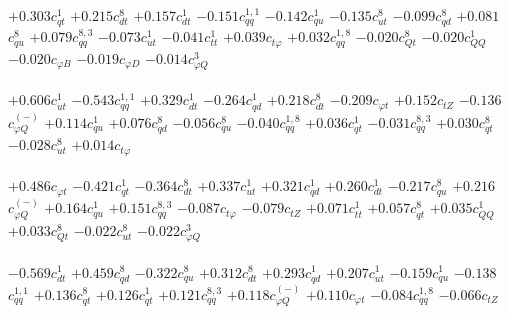 \documentclass{article}
\begin{document}
{$+0.303$}{\rm $c_{qt}^{1}$} 
{$+0.215$}{\rm $c_{dt}^{8}$} 
{$+0.157$}{\rm $c_{dt}^{1}$} 
{$-0.151$}{\rm $c_{qq}^{1,1}$} 
{$-0.142$}{\rm $c_{qu}^{1}$} 
{$-0.135$}{\rm $c_{ut}^{8}$} 
{$-0.099$}{\rm $c_{qd}^{8}$} 
{$+0.081$}{\rm $c_{qu}^{8}$} 
{$+0.079$}{\rm $c_{qq}^{8,3}$} 
{$-0.073$}{\rm $c_{ut}^{1}$} 
{$-0.041$}{\rm $c_{tt}^{1}$} 
{$+0.039$}{\rm $c_{t \varphi}$} 
{$+0.032$}{\rm $c_{qq}^{1,8}$} 
{$-0.020$}{\rm $c_{Qt}^{8}$} 
{$-0.020$}{\rm $c_{QQ}^{1}$} 
{$-0.020$}{\rm $c_{\varphi B}$} 
{$-0.019$}{\rm $c_{\varphi D}$} 
{$-0.014$}{\rm $c_{\varphi Q}^{3}$} 
 \nonumber \\ \nonumber \\ 
{$+0.606$}{\rm $c_{ut}^{1}$} 
{$-0.543$}{\rm $c_{qq}^{1,1}$} 
{$+0.329$}{\rm $c_{dt}^{1}$} 
{$-0.264$}{\rm $c_{qd}^{1}$} 
{$+0.218$}{\rm $c_{dt}^{8}$} 
{$-0.209$}{\rm $c_{\varphi t}$} 
{$+0.152$}{\rm $c_{tZ}$} 
{$-0.136$}{\rm $c_{\varphi Q}^{(-)}$} 
{$+0.114$}{\rm $c_{qu}^{1}$} 
{$+0.076$}{\rm $c_{qd}^{8}$} 
{$-0.056$}{\rm $c_{qu}^{8}$} 
{$-0.040$}{\rm $c_{qq}^{1,8}$} 
{$+0.036$}{\rm $c_{qt}^{1}$} 
{$-0.031$}{\rm $c_{qq}^{8,3}$} 
{$+0.030$}{\rm $c_{qt}^{8}$} 
{$-0.028$}{\rm $c_{ut}^{8}$} 
{$+0.014$}{\rm $c_{t \varphi}$} 
 \nonumber \\ \nonumber \\ 
{$+0.486$}{\rm $c_{\varphi t}$} 
{$-0.421$}{\rm $c_{qt}^{1}$} 
{$-0.364$}{\rm $c_{dt}^{8}$} 
{$+0.337$}{\rm $c_{ut}^{1}$} 
{$+0.321$}{\rm $c_{qd}^{1}$} 
{$+0.260$}{\rm $c_{dt}^{1}$} 
{$-0.217$}{\rm $c_{qu}^{8}$} 
{$+0.216$}{\rm $c_{\varphi Q}^{(-)}$} 
{$+0.164$}{\rm $c_{qu}^{1}$} 
{$+0.151$}{\rm $c_{qq}^{8,3}$} 
{$-0.087$}{\rm $c_{t \varphi}$} 
{$-0.079$}{\rm $c_{tZ}$} 
{$+0.071$}{\rm $c_{tt}^{1}$} 
{$+0.057$}{\rm $c_{qt}^{8}$} 
{$+0.035$}{\rm $c_{QQ}^{1}$} 
{$+0.033$}{\rm $c_{Qt}^{8}$} 
{$-0.022$}{\rm $c_{ut}^{8}$} 
{$-0.022$}{\rm $c_{\varphi Q}^{3}$} 
 \nonumber \\ \nonumber \\ 
{$-0.569$}{\rm $c_{dt}^{1}$} 
{$+0.459$}{\rm $c_{qd}^{8}$} 
{$-0.322$}{\rm $c_{qu}^{8}$} 
{$+0.312$}{\rm $c_{dt}^{8}$} 
{$+0.293$}{\rm $c_{qd}^{1}$} 
{$+0.207$}{\rm $c_{ut}^{1}$} 
{$-0.159$}{\rm $c_{qu}^{1}$} 
{$-0.138$}{\rm $c_{qq}^{1,1}$} 
{$+0.136$}{\rm $c_{qt}^{8}$} 
{$+0.126$}{\rm $c_{qt}^{1}$} 
{$+0.121$}{\rm $c_{qq}^{8,3}$} 
{$+0.118$}{\rm $c_{\varphi Q}^{(-)}$} 
{$+0.110$}{\rm $c_{\varphi t}$} 
{$-0.084$}{\rm $c_{qq}^{1,8}$} 
{$-0.066$}{\rm $c_{tZ}$} 
\end{document}
